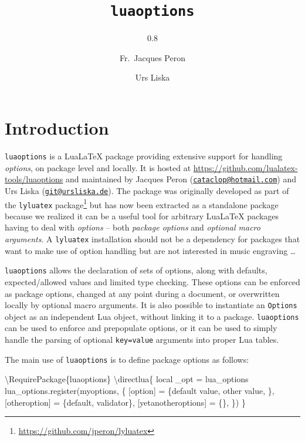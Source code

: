 \documentclass[
]{luaoptionsmanual}
\title{\texttt{luaoptions}}
\subtitle{0.8}
\author{Fr.~Jacques Peron \and Urs Liska}
\date{\luaoptionsmanualdate}
\newenvironment{Shaded}{}{}
\newcommand{\FunctionTok}[1]{\textcolor[rgb]{0.02,0.16,0.49}{#1}}
\newcommand{\NormalTok}[1]{#1}
\begin{document}
\maketitle

\thispagestyle{empty}
\enlargethispage*{3\baselineskip}

\hypertarget{introduction}{%
\section{Introduction}\label{introduction}}

\texttt{luaoptions} is a LuaLaTeX package providing extensive support
for handling \emph{options}, on package level and locally. It is hosted
at \url{https://github.com/lualatex-tools/luaoptions} and maintained by
Jacques Peron
(\href{mailto:cataclop@hotmail.com}{\nolinkurl{cataclop@hotmail.com}})
and Urs Liska
(\href{mailto:git@ursliska.de}{\nolinkurl{git@ursliska.de}}). The
package was originally developed as part of the \texttt{lyluatex}
package\footnote{\url{https://github.com/jperon/lyluatex}} but has now
been extracted as a standalone package because we realized it can be a
useful tool for arbitrary LuaLaTeX packages having to deal with
\emph{options} -- both \emph{package options} and \emph{optional macro
arguments}. A \texttt{lyluatex} installation should not be a dependency
for packages that want to make use of option handling but are not
interested in music engraving \dots

\texttt{luaoptions} allows the declaration of sets of options, along
with defaults, expected/allowed values and limited type checking. These
options can be enforced as package options, changed at any point during
a document, or overwritten locally by optional macro arguments. It is
also possible to instantiate an \texttt{Options} object as an
independent Lua object, without linking it to a package.
\texttt{luaoptions} can be used to enforce and prepopulate options, or
it can be used to simply handle the parsing of optional
\texttt{key=value} arguments into proper Lua tables.

The main use of \texttt{luaoptions} is to define package options as
follows:

\begin{Shaded}
\begin{Highlighting}[]
\FunctionTok{\textbackslash{}RequirePackage}\NormalTok{\{luaoptions\}}
\FunctionTok{\textbackslash{}directlua}\NormalTok{\{}
\NormalTok{  local \_opt = lua\_options}
\NormalTok{  lua\_options.register(\textquotesingle{}myoptions\textquotesingle{}, \{}
\NormalTok{    [\textquotesingle{}option\textquotesingle{}] = \{\textquotesingle{}default value\textquotesingle{}, \textquotesingle{}other value\textquotesingle{}, \textquotesingle{}\textquotesingle{}\},}
\NormalTok{    [\textquotesingle{}otheroption\textquotesingle{}] = \{\textquotesingle{}default\textquotesingle{}, validator\},}
\NormalTok{    [\textquotesingle{}yetanotheroptions\textquotesingle{}] = \{\},}
\NormalTok{  \})}
\NormalTok{\}}
\end{Highlighting}
\end{Shaded}
\end{document}

